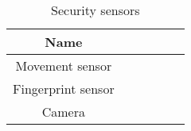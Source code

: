             \begin{table}
                \centering
                \caption{Security sensors}
                \begin{tabular}{ |c|c|c|c|c|c|}
                    \hline
                    {\textbf{Name}}  \\ 
                    \hline

                    Movement sensor  \\
                    \hline
                    Fingerprint sensor  \\
                    \hline
                    Camera \\
                    \hline
                \end{tabular}
                \label{table:security_sen}
            \end{table}
          


